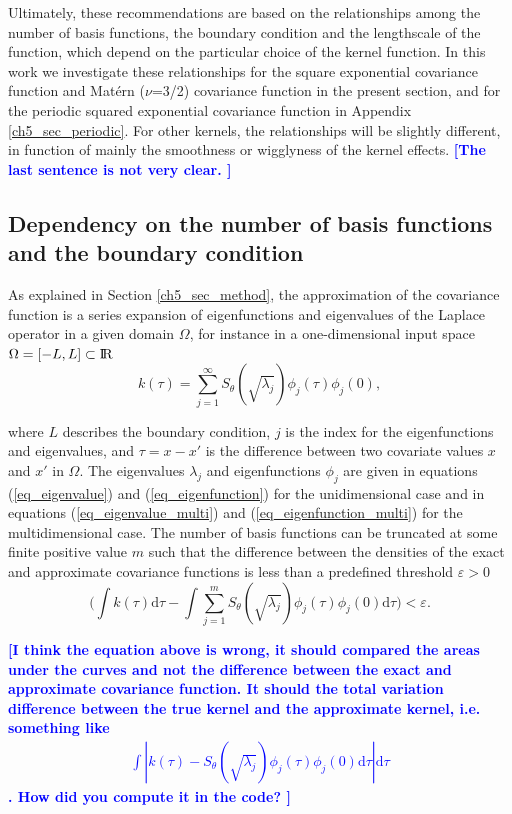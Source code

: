 \documentclass[onecolumn,a4paper,11pt]{article}
\newcommand{\todo}[1]{\textcolor{blue}{\textbf{[#1]}}}
\begin{document}
Ultimately, these recommendations are based on the relationships among the number of basis functions, the boundary condition and the lengthscale of the function, which depend on the particular choice of the kernel function. In this work we investigate these relationships for the square exponential covariance function and Mat{\'e}rn ($\nu$=3/2) covariance function in the present section, and for the periodic squared exponential covariance function in Appendix \ref{ch5_sec_periodic}. For other kernels, the relationships will be slightly different, in function of mainly the smoothness or wigglyness of the kernel effects. \todo{The last sentence is not very clear. }

\subsection{Dependency on the number of basis functions and the boundary condition} \label{ch5_subsec_dependency}

As explained in Section \ref{ch5_sec_method}, the approximation of the covariance function is a series expansion of eigenfunctions and eigenvalues of the Laplace operator in a given domain $\Omega$, for instance in a one-dimensional input space $\Omega=[-L,L]\subset {\rm I\!R}$
%
\begin{equation*}
k(\tau) = \sum_{j=1}^{\infty} S_{\theta}(\sqrt{\lambda_j}) \phi_j(\tau) \phi_j(0), 
\end{equation*} 

\noindent where $L$ describes the boundary condition, $j$ is the index for the eigenfunctions and eigenvalues, and $\tau=x-x'$ is the difference between two covariate values $x$ and $x'$ in $\Omega$. The eigenvalues $\lambda_j$ and eigenfunctions $\phi_j$ are given in equations (\ref{eq_eigenvalue}) and (\ref{eq_eigenfunction}) for the unidimensional case and in equations (\ref{eq_eigenvalue_multi}) and (\ref{eq_eigenfunction_multi}) for the multidimensional case. The number of basis functions can be truncated at some finite positive value $m$ such that the difference between the densities of the exact and approximate covariance functions is less than a predefined threshold $\varepsilon > 0$
%
\begin{equation}\label{eq_diff_covs}
\Big( \int k(\tau) \mathrm{d}\tau - 
\int \sum_{j=1}^m S_{\theta}(\sqrt{\lambda_j}) \phi_j(\tau) \phi_j(0) \mathrm{d}\tau \Big) < \varepsilon.
\end{equation}

\todo{I think the equation above is wrong, it should compared the areas under the curves and not the difference between the exact and approximate covariance function. It should the total variation difference between the true kernel and the approximate kernel, i.e. something like
\begin{align*}
\int|k(\tau) -S_{\theta}(\sqrt{\lambda_j}) \phi_j(\tau) \phi_j(0) \mathrm{d}\tau |\mathrm{d}\tau 
\end{align*}.
How did you compute it in the code?
}
\end{document}
